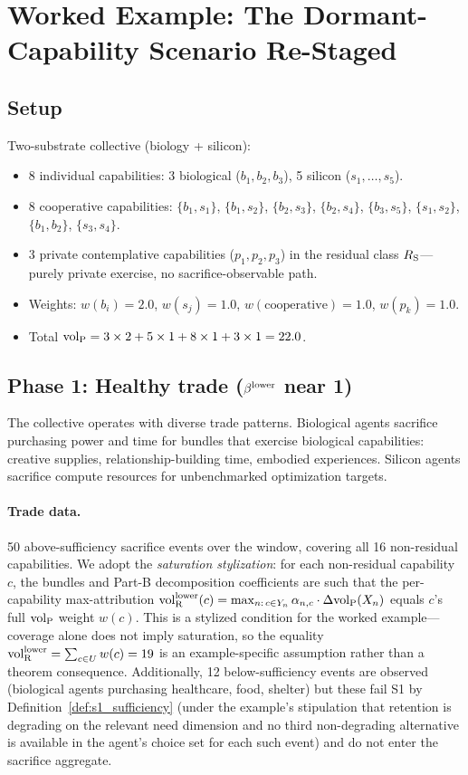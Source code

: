 \section{Worked Example: The Dormant-Capability Scenario Re-Staged}
\label{sec:worked_example}

\subsection{Setup}

Two-substrate collective (biology + silicon):
\begin{itemize}
\item 8 individual capabilities: 3 biological ($b_1, b_2, b_3$),
  5 silicon ($s_1, \ldots, s_5$).
\item 8 cooperative capabilities:
  $\{b_1, s_1\}$, $\{b_1, s_2\}$, $\{b_2, s_3\}$,
  $\{b_2, s_4\}$, $\{b_3, s_5\}$, $\{s_1, s_2\}$,
  $\{b_1, b_2\}$, $\{s_3, s_4\}$.
\item 3 private contemplative capabilities ($p_1, p_2, p_3$) in
  the residual class $R_{\mathrm{S}}$---purely private exercise, no
  sacrifice-observable path.
\item Weights: $w(b_i) = 2.0$, $w(s_j) = 1.0$,
  $w(\mathrm{cooperative}) = 1.0$, $w(p_k) = 1.0$.
\item Total ${\operatorname{vol}_{\mathrm{P}}} = 3 \times 2 + 5 \times 1 + 8 \times 1 + 3
  \times 1 = 22.0$.
\end{itemize}

\subsection{Phase 1: Healthy trade ($\beta^{\mathrm{lower}}$ near 1)}

The collective operates with diverse trade patterns.  Biological
agents sacrifice purchasing power and time for bundles that
exercise biological capabilities: creative supplies,
relationship-building time, embodied experiences.  Silicon agents
sacrifice compute resources for unbenchmarked optimization
targets.

\paragraph{Trade data.}
50 above-sufficiency sacrifice events over the window, covering
all 16 non-residual capabilities.  We adopt the
\emph{saturation stylization}: for each non-residual capability
$c$, the bundles and Part-B decomposition coefficients are such
that the per-capability max-attribution ${\operatorname{vol}_{\mathrm{R}}^{\mathrm{lower}}}(c) =
\max_{n :\, c \in Y_n} \alpha_{n,c} \cdot \Delta{\operatorname{vol}_{\mathrm{P}}}(X_n)$
equals $c$'s full ${\operatorname{vol}_{\mathrm{P}}}$ weight $w(c)$.  This is a stylized
condition for the worked example---coverage alone does not
imply saturation, so the equality ${\operatorname{vol}_{\mathrm{R}}^{\mathrm{lower}}} = \sum_{c \in U}
w(c) = 19$ is an example-specific assumption rather than a
theorem consequence.  Additionally, 12 below-sufficiency events
are observed (biological agents purchasing healthcare, food,
shelter) but these fail S1 by
Definition~\ref{def:s1_sufficiency} (under the example's
stipulation that retention is degrading on the relevant need
dimension and no third non-degrading alternative is available
in the agent's choice set for each such event) and do not enter the
sacrifice aggregate.

